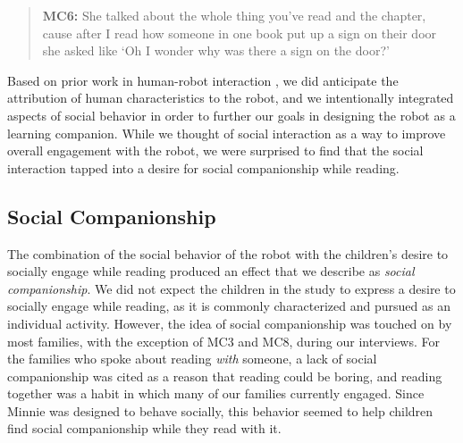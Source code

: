 \documentclass{sigchi}
\begin{document}
	\begin{quote}
		\textbf{MC6:} She talked about the whole thing you've read and the chapter, cause after I read how someone in one book put up a sign on their door she asked like `Oh I wonder why was there a sign on the door?'
	\end{quote} 

Based on prior work in human-robot interaction \cite{Duffy:2003}, we did anticipate the attribution of human characteristics to the robot, and we intentionally integrated aspects of social behavior in order to further our goals in designing the robot as a learning companion. While we thought of social interaction as a way to improve overall engagement with the robot, we were surprised to find that the social interaction tapped into a desire for social companionship while reading.

\subsection{Social Companionship}

The combination of the social behavior of the robot with the children's desire to socially engage while reading produced an effect that we describe as \textit{social companionship}. We did not expect the children in the study to express a desire to socially engage while reading, as it is commonly characterized and pursued as an individual activity. However, the idea of social companionship was touched on by most families, with the exception of MC3 and MC8, during our interviews. For the families who spoke about reading \textit{with} someone, a lack of social companionship was cited as a reason that reading could be boring, and reading together was a habit in which many of our families currently engaged. Since Minnie was designed to behave socially, this behavior seemed to help children find social companionship while they read with it. 
\end{document}
